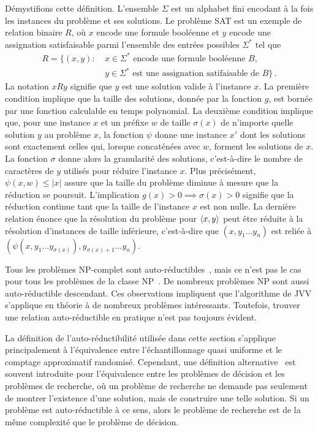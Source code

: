 Démystifions cette définition. L'ensemble $\Sigma$ est un alphabet fini encodant à la fois les instances du problème et ses solutions. Le problème SAT est un exemple de relation binaire $R$, où $x$ encode une formule booléenne et $y$ encode une assignation satisfaisable parmi l'ensemble des entrées possibles $\Sigma^{*}$ tel que
\begin{equation}
    \begin{aligned}
    R = \{ (x,y) : \ & x \in \Sigma^{*} \text{ encode une formule booléenne } B, \\ 
    & y \in \Sigma^{*} \text{ est une assignation satifaisable de } B \} \,.
    \end{aligned}
\end{equation}
La notation $xRy$ signifie que $y$ est une solution valide à l'instance $x$. La première condition implique que la taille des solutions, donnée par la fonction $g$, est bornée par une fonction calculable en temps polynomial. La deuxième condition implique que, pour une instance $x$ et un préfixe $w$ de taille $\sigma(x)$ de n'importe quelle solution $y$ au problème $x$, la fonction $\psi$ donne une instance $x'$ dont les solutions sont exactement celles qui, lorsque concaténées avec $w$, forment les solutions de $x$. La fonction $\sigma$ donne alors la granularité des solutions, c'est-à-dire le nombre de caractères de $y$ utilisés pour réduire l'instance $x$. Plus précisément, $\psi(x, w) \leq \lvert x \rvert$ assure que la taille du problème diminue à mesure que la réduction se poursuit. L'implication $g(x) > 0 \implies  \sigma(x) > 0$ signifie que la réduction continue tant que la taille de l'instance $x$ est non nulle. La dernière relation énonce que la résolution du problème pour $\braket{x, y}$ peut être réduite à la résolution d'instances de taille inférieure, c'est-à-dire que $(x, y_{1}\dots y_{n})$ est reliée à $(\psi(x, y_{1}\dots y_{\sigma (x)}), y_{\sigma(x)+1}\dots y_{n})$.

Tous les problèmes \textsf{NP}-complet sont auto-réductibles~\cite{goldreichComputationalComplexityConceptual2008}, mais ce n'est pas le cas pour tous les problèmes de la classe \textsf{NP}~\cite{khullerPlanarGraphColoring1991a}. De nombreux problèmes \textsf{NP} sont aussi auto-réductible descendant. Ces observations impliquent que l'algorithme de JVV s'applique en théorie à de nombreux problèmes intéressants. Toutefois, trouver une relation auto-réductible en pratique n'est pas toujours évident.

La définition de l'auto-réductibilité utilisée dans cette section s'applique principalement à l'équivalence entre l'échantillonnage quasi uniforme et le comptage approximatif randomisé. Cependant, une définition alternative~\cite{goldreichComputationalComplexityConceptual2008} est souvent introduite pour l'équivalence entre les problèmes de décision et les problèmes de recherche, où un problème de recherche ne demande pas seulement de montrer l'existence d'une solution, mais de construire une telle solution. Si un problème est auto-réductible à ce sens, alors le problème de recherche est de la même complexité que le problème de décision. 

